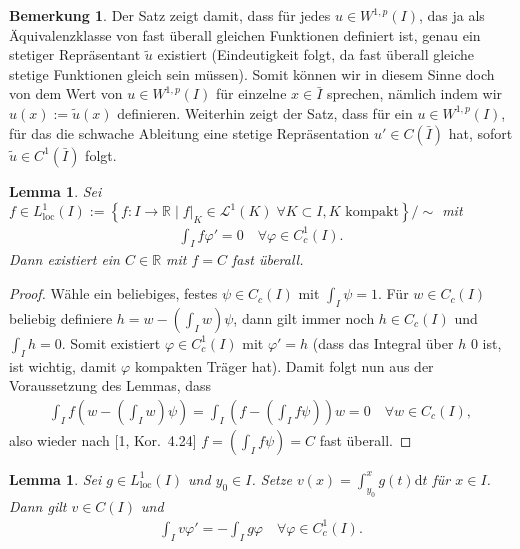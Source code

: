 \documentclass[twoside]{article}
\newtheorem{lemma}[theorem]{Lemma}
\theoremstyle{definition}
\newtheorem{remark}[theorem]{Bemerkung}
\begin{document}
\begin{remark}
Der Satz zeigt damit, dass für jedes $u \in W^{1,p}(I)$, das ja als Äquivalenzklasse von fast überall gleichen Funktionen definiert ist, genau ein stetiger Repräsentant $\tilde{u}$ existiert (Eindeutigkeit folgt, da fast überall gleiche stetige Funktionen gleich sein müssen). Somit können wir in diesem Sinne doch von dem Wert von $u \in W^{1,p}(I)$ für einzelne $x \in \bar{I}$ sprechen, nämlich indem wir $u(x) := \tilde{u}(x)$ definieren. Weiterhin zeigt der Satz, dass für ein $u \in W^{1,p}(I)$, für das die schwache Ableitung eine stetige Repräsentation $u' \in C(\bar{I})$ hat, sofort $\tilde{u} \in C^1(\bar{I})$ folgt.
\end{remark}
\begin{lemma}
Sei $f \in L^1_{\text{loc}}(I) := \left\{f : I \to  \mathbb{R} \;  | \;  f|_K \in \mathcal{L}^1(K) \; \forall K \subset I, K \text{ kompakt}\right\} / \sim$ mit
\begin{align}
\int_I f \varphi' = 0 \quad \forall\varphi\in C_c^1(I).
\end{align}
Dann existiert ein $C \in \mathbb{R}$ mit $f = C$ fast überall.
\end{lemma}
\begin{proof}
Wähle ein beliebiges, festes $\psi \in C_c(I)$ mit $\int_I \psi = 1$. Für $w \in C_c(I)$ beliebig definiere $h = w - (\int_I w) \psi$, dann gilt immer noch $h \in C_c(I)$ und $\int_I h = 0$. Somit existiert $\varphi \in C_c^1(I)$ mit $\varphi' = h$ (dass das Integral über $h$ 0 ist, ist wichtig, damit $\varphi$ kompakten Träger hat). Damit folgt nun aus der Voraussetzung des Lemmas, dass
\begin{align*}
\int_I f \left(w - \left(\int_I w \right) \psi \right) = \int_I  \left(f - \left(\int_I f \psi \right) \right) w = 0 \quad \forall w \in C_c(I),
\end{align*}
also wieder nach [1, Kor.\ 4.24] $f = \left(\int_I f \psi \right) = C $ fast überall.
\end{proof}
\begin{lemma}
Sei $g \in L^1_{\text{loc}}(I)$ und $y_0 \in I$. Setze $v(x) = \int_{y_0}^x g(t) \mathrm{d}t$ für $x \in I$. Dann gilt $v \in C(I)$ und
\begin{align*}
\int_I v \varphi' = - \int_I g \varphi \quad \forall \varphi \in C_c^1(I).
\end{align*}
\end{lemma}
\end{document}
